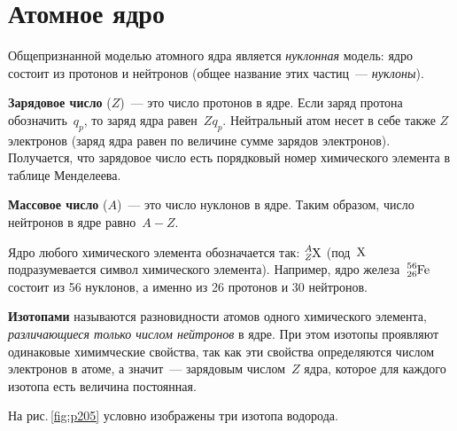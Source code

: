 \documentclass[main.tex]{subfiles}
\begin{document}

 

 

\setcounter{section}{20
}
\addtocounter{section}{-1} 

\section{Атомное ядро}


Общепризнанной моделью атомного ядра является \emph{нуклонная} модель: ядро состоит из протонов и нейтронов (общее название этих частиц~--- \emph{нуклоны}).

\textbf{Зарядовое число} ($Z$)~--- это число протонов в ядре. Если заряд протона обозначить~$q_p$, то заряд ядра равен~$Zq_p$. Нейтральный атом несет в себе также $Z$ электронов (заряд ядра равен по величине сумме зарядов электронов). Получается, что зарядовое число есть порядковый номер химического элемента в таблице Менделеева.

\textbf{Массовое число} ($A$)~--- это число нуклонов в ядре. Таким образом, число нейтронов в ядре равно~$A-Z$.

Ядро любого химического элемента обозначается так:
$\ce{^$A$_$Z$X}$ (под~$\ce{X}$ подразумевается символ химического элемента). Например, ядро железа~$\ce{^56_26Fe}$ состоит из 56 нуклонов, а именно из 26 протонов и 30 нейтронов.

\textbf{Изотопами} называются разновидности атомов одного химического элемента, \emph{различающиеся только числом нейтронов} в ядре. При этом изотопы проявляют одинаковые химимческие свойства, так как эти свойства определяются числом электронов в атоме, а значит~--- зарядовым числом~$Z$ ядра, которое для каждого изотопа есть величина постоянная.

На рис.\,\ref{fig:p205} условно изображены три изотопа водорода. 
\end{document}
